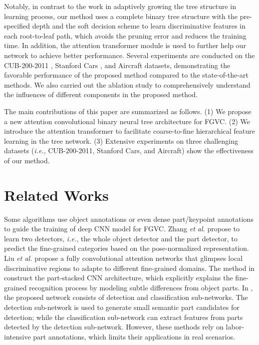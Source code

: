 \documentclass[10pt,twocolumn,letterpaper]{article}
\def\ie{{\em i.e.}}
\def\etal{{\em et al.}}
\begin{document}
Notably, in contrast to the work in \cite{DBLP:conf/icml/TannoAACN19} adaptively growing the tree structure in learning process, our method uses a complete binary tree structure with the pre-specified depth and the soft decision scheme to learn discriminative features in each root-to-leaf path, which avoids the pruning error and reduces the training time. In addition, the attention transformer module is used to further help our network to achieve better performance. Several experiments are conducted on the CUB-200-2011 \cite{report-wahcub_200_2011}, Stanford Cars \cite{DBLP:conf/iccvw/Krause0DF13}, and Aircraft \cite{maji13fine-grained} datasets, demonstrating the favorable performance of the proposed method compared to the state-of-the-art methods. We also carried out the ablation study to comprehensively understand the influences of different components in the proposed method.

The main contributions of this paper are summarized as follows. (1) We propose a new attention convolutional binary neural tree architecture for FGVC. (2) We introduce the attention transformer to facilitate coarse-to-fine hierarchical feature learning in the tree network. (3) Extensive experiments on three challenging datasets (\ie, CUB-200-2011, Stanford Cars, and Aircraft) show the effectiveness of our method.

\section{Related Works}
{} Some algorithms \cite{DBLP:conf/eccv/ZhangDGD14,DBLP:journals/corr/LiuXWL16,DBLP:conf/cvpr/HuangXTZ16,DBLP:conf/cvpr/ZhangXEHZEM16} use object annotations or even dense part/keypoint annotations to guide the training of deep CNN model for FGVC. Zhang \etal \cite{DBLP:conf/eccv/ZhangDGD14} propose to learn two detectors, \ie, the whole object detector and the part detector, to predict the fine-grained categories based on the pose-normalized representation. Liu \etal \cite{DBLP:journals/corr/LiuXWL16} propose a fully convolutional attention networks that glimpses local discriminative regions to adapte to different fine-grained domains. The method in \cite{DBLP:conf/cvpr/HuangXTZ16} construct the part-stacked CNN architecture, which explicitly explains the fine-grained recognition process by modeling subtle differences from object parts. In \cite{DBLP:conf/cvpr/ZhangXEHZEM16}, the proposed network consists of detection and classification sub-networks. The detection sub-network is used to generate small semantic part candidates for detection; while the classification sub-network can extract features from parts detected by the detection sub-network. However, these methods rely on labor-intensive part annotations, which limits their applications in real scenarios.
\end{document}
